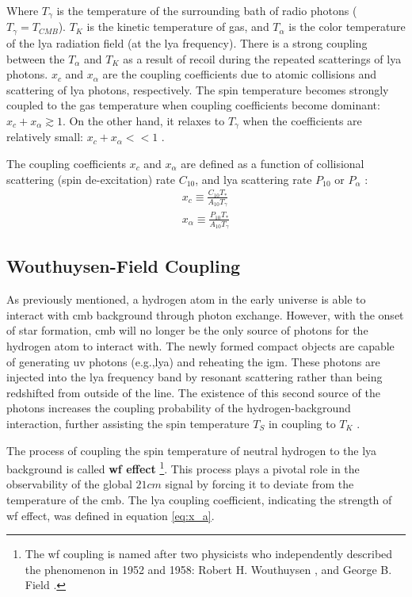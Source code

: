 \documentclass[12pt, TexShade, letterpaper]{report}
\begin{document}
Where $T_\gamma$ is the temperature of the surrounding bath of radio photons ($T_\gamma = T_{CMB}$). $T_K$ is the kinetic temperature of gas, and $T_\alpha$ is the color temperature of the \gls{lya} radiation field (at the \gls{lya} frequency). There is a strong coupling between the $T_\alpha$ and $T_K$ as a result of recoil during the repeated scatterings of \gls{lya} photons. $x_c$ and $x_\alpha$ are the coupling coefficients due to atomic collisions and scattering of \gls{lya} photons, respectively. The spin temperature becomes strongly coupled to the gas temperature when coupling coefficients become dominant: $x_c + x_\alpha \gtrsim 1$. On the other hand, it relaxes to $T_\gamma$ when the coefficients are relatively small: $x_c + x_\alpha << 1$ \cite{21century, low_frequency}. \par
The coupling coefficients $x_c$ and $x_\alpha$ are defined as a function of collisional scattering (spin de-excitation) rate $C_{10}$, and \gls{lya} scattering rate $P_{10}$ or $P_\alpha$ \cite{explore_cosmic_dawn, low_frequency}:
\begin{gather}
    x_c \equiv \frac{C_{10}T_*}{A_{10}T_\gamma}\\
    x_\alpha \equiv \frac{P_{10} T_*}{A_{10}T_\gamma} \label{eq:x_a}
\end{gather}
\subsection{Wouthuysen-Field Coupling}
As previously mentioned, a hydrogen atom in the early universe is able to interact with \gls{cmb} background through photon exchange. However, with the onset of star formation, \gls{cmb} will no longer be the only source of photons for the hydrogen atom to interact with. The newly formed compact objects are capable of generating \gls{uv} photons (e.g.,\gls{lya}) and reheating the \gls{igm}. These photons are injected into the \gls{lya} frequency band by resonant scattering rather than being redshifted from outside of the line. The existence of this second source of the photons increases the coupling probability of the hydrogen-background interaction, further assisting the spin temperature $T_S$ in coupling to $T_K$ \cite{21century, low_frequency}.\par
The process of coupling the spin temperature of neutral hydrogen to the \gls{lya} background is called \textbf{\gls{wf} effect} \cite{barkana2001beginning}\footnote{The \gls{wf} coupling is named after two physicists who independently described the phenomenon in 1952 and 1958: Robert H. Wouthuysen \cite{wouthuysen_original}, and George B. Field \cite{field_original}.}. This process plays a pivotal role in the observability of the global $21cm$ signal by forcing it to deviate from the temperature of the \gls{cmb}. The \gls{lya} coupling coefficient, indicating the strength of \gls{wf} effect, was defined in equation \ref{eq:x_a}. \par
\end{document}
